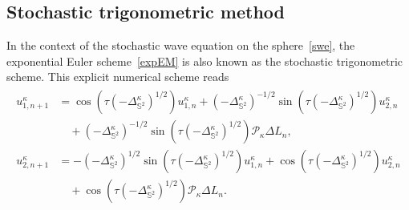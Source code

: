 \documentclass[11pt]{amsart}
\newcommand{\IS}{\mathbb{S}}
\newcommand{\Deltalb}{\Delta_{\IS^2}}
\newcommand{\cP}{\mathcal{P}}
\begin{document}
\subsection{Stochastic trigonometric method}
In the context of the stochastic wave equation on the sphere~\eqref{swe}, the exponential Euler scheme~\eqref{expEM} is also known as the stochastic trigonometric scheme. This explicit numerical scheme reads 
\begin{align}
\label{eqn:SWE_trigo}
\begin{split}
	u_{1,n+1}^\kappa&=\cos(\tau(-\Deltalb^\kappa)^{1/2})u_{1,n}^\kappa+(-\Deltalb^\kappa)^{-1/2}\sin(\tau(-\Deltalb^\kappa)^{1/2})u_{2,n}^\kappa\\
	&\quad+(-\Deltalb^\kappa)^{-1/2}\sin(\tau(-\Deltalb^\kappa)^{1/2})\cP_\kappa\Delta L_n,\\
    u_{2,n+1}^\kappa&=-(-\Deltalb^\kappa)^{1/2}\sin(\tau(-\Deltalb^\kappa)^{1/2})u_{1,n}^\kappa+\cos(\tau(-\Deltalb^\kappa)^{1/2})u_{2,n}^\kappa\\
    &\quad+\cos(\tau(-\Deltalb^\kappa)^{1/2})\cP_\kappa\Delta L_n.
\end{split}    
\end{align}
\end{document}
